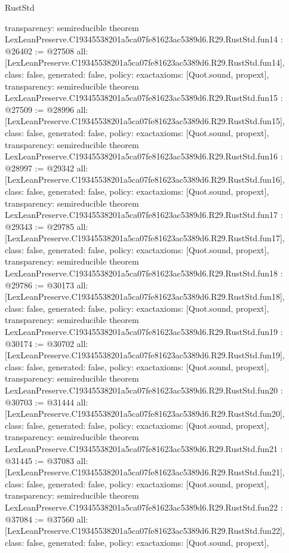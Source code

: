 \begin{lexlean}{RustStd}
\begin{coremodule}
{  transparency: semireducible
}
theorem LexLeanPreserve.C19345538201a5ca07fe81623ac5389d6.R29.RustStd.fun14 : @26402 := @27508 {
  all: [LexLeanPreserve.C19345538201a5ca07fe81623ac5389d6.R29.RustStd.fun14],
  class: false,
  generated: false,
  policy: exact{axioms: [Quot.sound, propext]},
  transparency: semireducible
}
theorem LexLeanPreserve.C19345538201a5ca07fe81623ac5389d6.R29.RustStd.fun15 : @27509 := @28996 {
  all: [LexLeanPreserve.C19345538201a5ca07fe81623ac5389d6.R29.RustStd.fun15],
  class: false,
  generated: false,
  policy: exact{axioms: [Quot.sound, propext]},
  transparency: semireducible
}
theorem LexLeanPreserve.C19345538201a5ca07fe81623ac5389d6.R29.RustStd.fun16 : @28997 := @29342 {
  all: [LexLeanPreserve.C19345538201a5ca07fe81623ac5389d6.R29.RustStd.fun16],
  class: false,
  generated: false,
  policy: exact{axioms: [Quot.sound, propext]},
  transparency: semireducible
}
theorem LexLeanPreserve.C19345538201a5ca07fe81623ac5389d6.R29.RustStd.fun17 : @29343 := @29785 {
  all: [LexLeanPreserve.C19345538201a5ca07fe81623ac5389d6.R29.RustStd.fun17],
  class: false,
  generated: false,
  policy: exact{axioms: [Quot.sound, propext]},
  transparency: semireducible
}
theorem LexLeanPreserve.C19345538201a5ca07fe81623ac5389d6.R29.RustStd.fun18 : @29786 := @30173 {
  all: [LexLeanPreserve.C19345538201a5ca07fe81623ac5389d6.R29.RustStd.fun18],
  class: false,
  generated: false,
  policy: exact{axioms: [Quot.sound, propext]},
  transparency: semireducible
}
theorem LexLeanPreserve.C19345538201a5ca07fe81623ac5389d6.R29.RustStd.fun19 : @30174 := @30702 {
  all: [LexLeanPreserve.C19345538201a5ca07fe81623ac5389d6.R29.RustStd.fun19],
  class: false,
  generated: false,
  policy: exact{axioms: [Quot.sound, propext]},
  transparency: semireducible
}
theorem LexLeanPreserve.C19345538201a5ca07fe81623ac5389d6.R29.RustStd.fun20 : @30703 := @31444 {
  all: [LexLeanPreserve.C19345538201a5ca07fe81623ac5389d6.R29.RustStd.fun20],
  class: false,
  generated: false,
  policy: exact{axioms: [Quot.sound, propext]},
  transparency: semireducible
}
theorem LexLeanPreserve.C19345538201a5ca07fe81623ac5389d6.R29.RustStd.fun21 : @31445 := @37083 {
  all: [LexLeanPreserve.C19345538201a5ca07fe81623ac5389d6.R29.RustStd.fun21],
  class: false,
  generated: false,
  policy: exact{axioms: [Quot.sound, propext]},
  transparency: semireducible
}
theorem LexLeanPreserve.C19345538201a5ca07fe81623ac5389d6.R29.RustStd.fun22 : @37084 := @37560 {
  all: [LexLeanPreserve.C19345538201a5ca07fe81623ac5389d6.R29.RustStd.fun22],
  class: false,
  generated: false,
  policy: exact{axioms: [Quot.sound, propext]},
}
\end{coremodule}
\end{lexlean}
